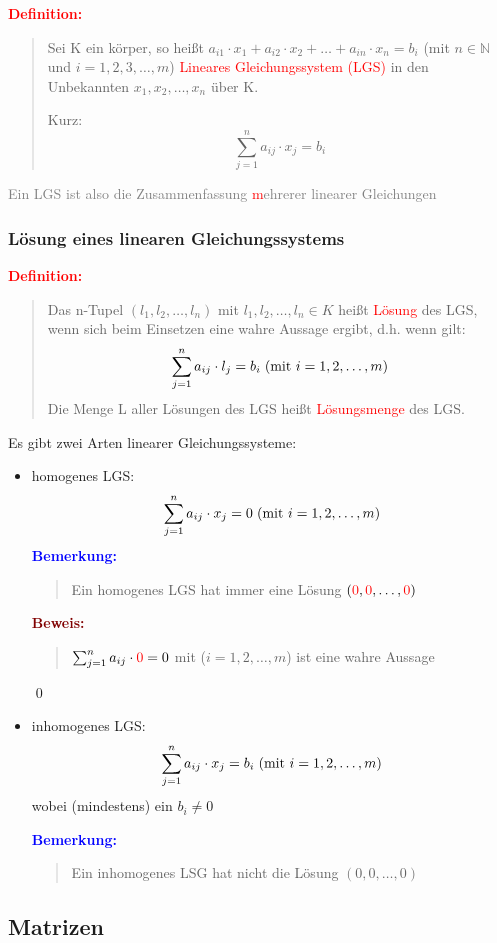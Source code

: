 \documentclass{article}
\newcommand{\smsp}{\phantom{\hspace{3px}}}
\newcommand{\red}[1]{\textcolor{red}{#1}}
\newcommand{\gray}[1]{\textcolor{gray}{#1}}
\newcommand{\blue}[1]{\textcolor{blue}{#1}}
\newcommand{\maroon}[1]{\textcolor{maroon}{#1}}
\newcommand{\de}[1]{\red{\textbf{Definition: }}\begin{quote}#1\end{quote}}
\newcommand{\an}[1]{\blue{\textbf{Bemerkung: }}\begin{quote}#1\end{quote}}
\newcommand{\pr}[1]{\maroon{\textbf{Beweis: }}\begin{quote}#1\end{quote}\qed}
\newcommand{\N}{\mathbb{N}}
\begin{document}
\de{Sei K ein körper, so heißt $a_{i1} \cdot x_1 + a_{i2} \cdot x_2 + \dots + a_{in} \cdot x_n = b_i$ (mit $n \in \N$ und $i = 1, 2, 3, \dots, m$) \red{Lineares Gleichungssystem (LGS)} in den Unbekannten $x_1, x_2, \dots, x_n$ über K.

Kurz: 
\begin{equation*}
    \sum_{j = 1}^{n} a_{ij} \cdot x_j = b_i
\end{equation*}}
\gray{Ein LGS ist also die Zusammenfassung \red{m}ehrerer linearer Gleichungen}

\newpage
\subsubsection{Lösung eines linearen Gleichungssystems}

\de{Das n-Tupel $(l_1, l_2, \dots, l_n)$ mit $l_1, l_2, \dots, l_n \in K$ heißt \red{Lösung} des LGS, wenn sich beim Einsetzen eine wahre Aussage ergibt, d.h. wenn gilt:
\begin{equation*}
    \sum_{j = 1}^{n} a_{ij} \cdot l_j = b_i \smsp (\text{mit } i = 1, 2, \dots, m)
\end{equation*} 
Die Menge L aller Lösungen des LGS heißt \red{Lösungsmenge} des LGS.}

Es gibt zwei Arten linearer Gleichungssysteme:
\begin{itemize}
    \item homogenes LGS: 
    \begin{equation*}
        \sum_{j = 1}^{n} a_{ij} \cdot x_j = 0 \smsp (\text{mit } i = 1, 2, \dots, m)
    \end{equation*}
    \an{Ein homogenes LGS hat immer eine Lösung $(\red{0}, \red{0}, \dots, \red{0})$}
    \pr{$\sum_{j = 1}^{n} a_{ij} \cdot \red{0} = 0$ mit ($i = 1, 2, \dots, m$) ist eine wahre Aussage}
    \item inhomogenes LGS:
    \begin{equation*}
        \sum_{j = 1}^{n} a_{ij} \cdot x_j = b_i \smsp (\text{mit } i = 1, 2, \dots, m)
    \end{equation*}
    wobei (mindestens) ein $b_i \neq 0$

    \an{Ein inhomogenes LSG hat nicht die Lösung $(0, 0, \dots, 0)$}
\end{itemize}

\subsection{Matrizen}
\end{document}
